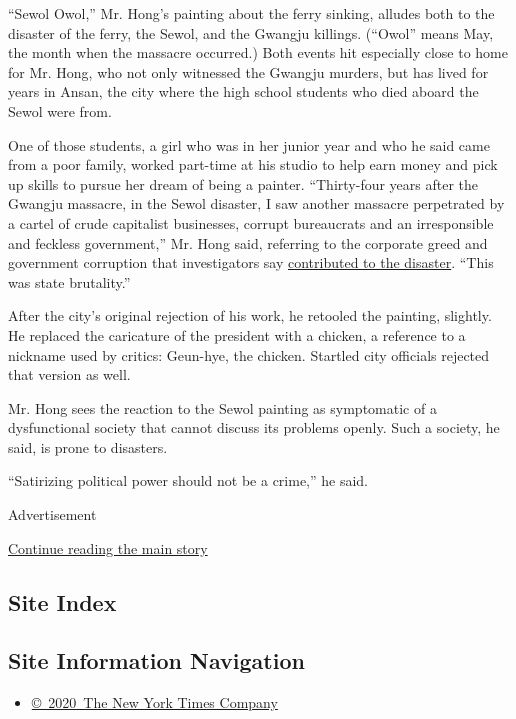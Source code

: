 ``Sewol Owol,'' Mr. Hong's painting about the ferry sinking, alludes
both to the disaster of the ferry, the Sewol, and the Gwangju killings.
(``Owol'' means May, the month when the massacre occurred.) Both events
hit especially close to home for Mr. Hong, who not only witnessed the
Gwangju murders, but has lived for years in Ansan, the city where the
high school students who died aboard the Sewol were from.

One of those students, a girl who was in her junior year and who he said
came from a poor family, worked part-time at his studio to help earn
money and pick up skills to pursue her dream of being a painter.
``Thirty-four years after the Gwangju massacre, in the Sewol disaster, I
saw another massacre perpetrated by a cartel of crude capitalist
businesses, corrupt bureaucrats and an irresponsible and feckless
government,'' Mr. Hong said, referring to the corporate greed and
government corruption that investigators say
\href{http://www.nytimes3xbfgragh.onion/2014/07/27/world/asia/in-ferry-deaths-a-south-korean-tycoons-downfall.html}{contributed
to the disaster}. ``This was state brutality.''

After the city's original rejection of his work, he retooled the
painting, slightly. He replaced the caricature of the president with a
chicken, a reference to a nickname used by critics: Geun-hye, the
chicken. Startled city officials rejected that version as well.

Mr. Hong sees the reaction to the Sewol painting as symptomatic of a
dysfunctional society that cannot discuss its problems openly. Such a
society, he said, is prone to disasters.

``Satirizing political power should not be a crime,'' he said.

Advertisement

\protect\hyperlink{after-bottom}{Continue reading the main story}

\hypertarget{site-index}{%
\subsection{Site Index}\label{site-index}}

\hypertarget{site-information-navigation}{%
\subsection{Site Information
Navigation}\label{site-information-navigation}}

\begin{itemize}
\tightlist
\item
  \href{https://help.nytimes3xbfgragh.onion/hc/en-us/articles/115014792127-Copyright-notice}{©~2020~The
  New York Times Company}
\end{itemize}

